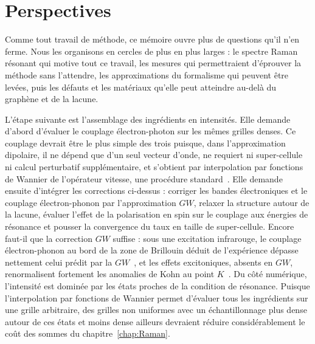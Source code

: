 \section{Perspectives}

Comme tout travail de méthode, ce mémoire ouvre plus de questions qu'il n'en ferme. Nous les organisons en cercles de plus en plus larges : le spectre Raman résonant qui motive tout ce travail, les mesures qui permettraient d'éprouver la méthode sans l'attendre, les approximations du formalisme qui peuvent être levées, puis les défauts et les matériaux qu'elle peut atteindre au-delà du graphène et de la lacune.


L'étape suivante est l'assemblage des ingrédients en intensités. Elle demande d'abord d'évaluer le couplage électron-photon sur les mêmes grilles denses. Ce couplage devrait être le plus simple des trois puisque, dans l'approximation dipolaire, il ne dépend que d'un seul vecteur d'onde, ne requiert ni super-cellule ni calcul perturbatif supplémentaire, et s'obtient par interpolation par fonctions de Wannier de l'opérateur vitesse, une procédure standard~\cite{yatesSpectralFermiSurface2007}. Elle demande ensuite d'intégrer les corrections ci-dessus : corriger les bandes électroniques et le couplage électron-phonon par l'approximation $GW$, relaxer la structure autour de la lacune, évaluer l'effet de la polarisation en spin sur le couplage aux énergies de résonance et pousser la convergence du taux en taille de super-cellule. Encore faut-il que la correction $GW$ suffise : sous une excitation infrarouge, le couplage électron-phonon au bord de la zone de Brillouin déduit de l'expérience dépasse nettement celui prédit par la $GW$~\cite{venanziProbingEnhancedElectronphonon2023,graziottoTheoryInfraredDoubleresonance2024}, et les effets excitoniques, absents en $GW$, renormalisent fortement les anomalies de Kohn au point $K$~\cite{guandaliniExcitonicEffectsPhonons2025}. Du côté numérique, l'intensité est dominée par les états proches de la condition de résonance. Puisque l'interpolation par fonctions de Wannier permet d'évaluer tous les ingrédients sur une grille arbitraire, des grilles non uniformes avec un échantillonnage plus dense autour de ces états et moins dense ailleurs devraient réduire considérablement le coût des sommes du chapitre~\ref{chap:Raman}.

